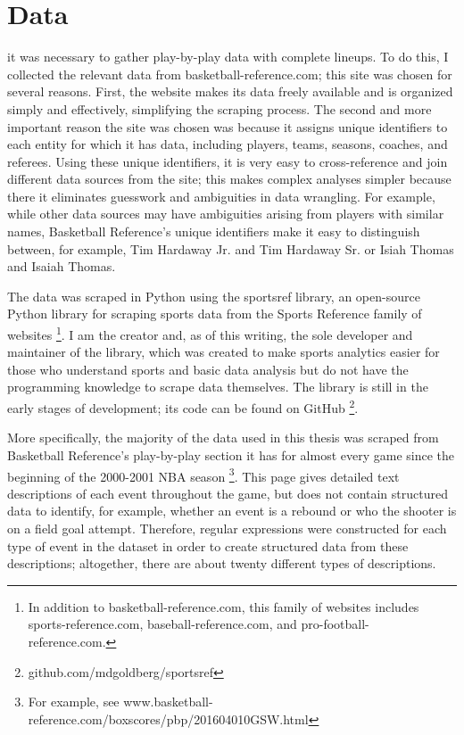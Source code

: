 
\chapter{Data} \label{ch:data}

\nocite{*}

 it was necessary to gather
play-by-play data with complete lineups. To do this, I collected the relevant data
from basketball-reference.com; this site was chosen for several reasons. First, the
website makes its data freely available and is organized simply and effectively,
simplifying the scraping process. The second and more important reason the site was
chosen was because it assigns unique identifiers to each entity for which it has
data, including players, teams, seasons, coaches, and referees.  Using these unique
identifiers, it is very easy to cross-reference and join different data sources from
the site; this makes complex analyses simpler because there it eliminates guesswork
and ambiguities in data wrangling. For example, while other data sources may have
ambiguities arising from players with similar names, Basketball Reference's unique
identifiers make it easy to distinguish between, for example, Tim Hardaway Jr.
and Tim Hardaway Sr. or Isiah Thomas and Isaiah Thomas.

The data was scraped in Python using the sportsref library, an open-source Python
library for scraping sports data from the Sports Reference family of
websites
\footnote{In addition to basketball-reference.com, this family of websites
includes sports-reference.com, baseball-reference.com, and
pro-football-reference.com.}.
I am the creator and, as of this writing, the sole developer and maintainer of the
library, which was created to make sports analytics easier for those who understand
sports and basic data analysis but do not have the programming knowledge to scrape
data themselves. The library is still in the early stages of development; its
code can be found on GitHub
\footnote{github.com/mdgoldberg/sportsref}.

More specifically, the majority of the data used in this thesis was scraped from
Basketball Reference's play-by-play section it has for almost every game since the
beginning of the 2000-2001 NBA season \footnote{For example, see
www.basketball-reference.com/boxscores/pbp/201604010GSW.html}. This page gives
detailed text descriptions of each event throughout the game, but does not contain
structured data to identify, for example, whether an event is a rebound or who the
shooter is on a field goal attempt. Therefore, regular expressions were constructed
for each type of event in the dataset in order to create structured data from these
descriptions; altogether, there are about twenty different types of descriptions.

